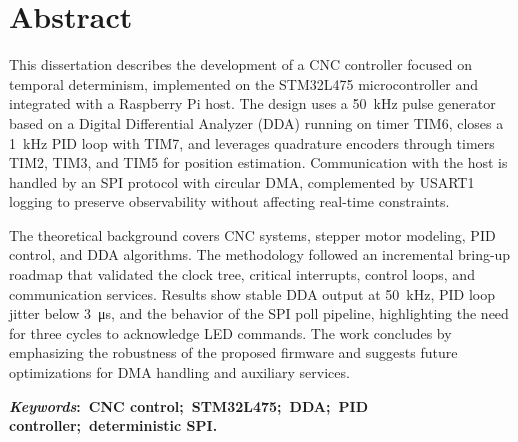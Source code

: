 \chapter*{Abstract}
\noindent This dissertation describes the development of a CNC controller
focused on temporal determinism, implemented on the STM32L475
microcontroller and integrated with a Raspberry Pi host. The design uses
a \SI{50}{\kilo\hertz} pulse generator based on a Digital Differential
Analyzer (DDA) running on timer TIM6, closes a \SI{1}{\kilo\hertz} PID
loop with TIM7, and leverages quadrature encoders through timers TIM2,
TIM3, and TIM5 for position estimation. Communication with the host is
handled by an SPI protocol with circular DMA, complemented by USART1
logging to preserve observability without affecting real-time
constraints.

The theoretical background covers CNC systems, stepper motor modeling,
PID control, and DDA algorithms. The methodology followed an incremental
bring-up roadmap that validated the clock tree, critical interrupts,
control loops, and communication services. Results show stable DDA output
at \SI{50}{\kilo\hertz}, PID loop jitter below \SI{3}{\micro\second}, and
the behavior of the SPI poll pipeline, highlighting the need for three
cycles to acknowledge LED commands. The work concludes by emphasizing the
robustness of the proposed firmware and suggests future optimizations for
DMA handling and auxiliary services.

\vspace{5mm}

\noindent\textbf{\textit{Keywords}:~CNC control;~STM32L475;~DDA;~PID controller;~deterministic SPI.}
